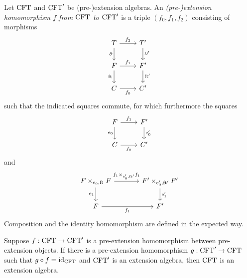 \begin{defn}
Let $\mathrm{CFT}$ and $\mathrm{CFT}'$ be (pre-)extension algebras. An \emph{(pre-)extension homomorphism $f$ from 
$\mathrm{CFT}$ to $\mathrm{CFT}'$} is a triple $(f_0,f_1,f_2)$ consisting of morphisms
\begin{equation*}
\begin{tikzcd}
\stesyst 
  \ar{r}{f_2}
  \ar{d}[swap]{\ebd}
  &
\stesyst'
  \ar{d}{\ebd'}
  \\
\stesysf 
  \ar{r}{f_1}
  \ar{d}[swap]{\eft}
  &
\stesysf'
  \ar{d}{\eft'}
  \\
\stesysc 
  \ar{r}[swap]{f_0}
  &
\stesysc'
\end{tikzcd}
\end{equation*}
such that the indicated squares commute, for which furthermore the squares
\begin{equation*}
\begin{tikzcd}
\stesysf \ar{r}{f_1}
  \ar{d}[swap]{\ectxext}
  &
\stesysf'
  \ar{d}{\ectxext'}
  \\
\stesysc
  \ar{r}[swap]{f_0}
  &
\stesysc'
\end{tikzcd}
\end{equation*}
and
\begin{equation*}
\begin{tikzcd}[column sep=large]
\stesysf\times_{\ectxext,\eft} \stesysf
  \ar{r}{f_1\times_{\ectxext',\eft'} f_1}
  \ar{d}[swap]{\efamext}
  &
\stesysf'\times_{\ectxext',\eft'} \stesysf'
  \ar{d}{\efamext'}
  \\
\stesysf
  \ar{r}[swap]{f_1}
  &
\stesysf'
\end{tikzcd}
\end{equation*}
Composition and the identity homomorphism are defined in the expected way.
\end{defn}

\begin{lem}\label{esys-retract}
Suppose $f:\mathrm{CFT}\to\mathrm{CFT}'$ is a pre-extension homomorphism between
pre-extension objects. If there is a pre-extension homomorphism $g:\mathrm{CFT}'\to
\mathrm{CFT}$ such that $g\circ f={\mathrm{id}_{\mathrm{CFT}}}$ and $\mathrm{CFT}'$ is an extension
algebra, then $\mathrm{CFT}$ is an extension algebra.
\end{lem}

